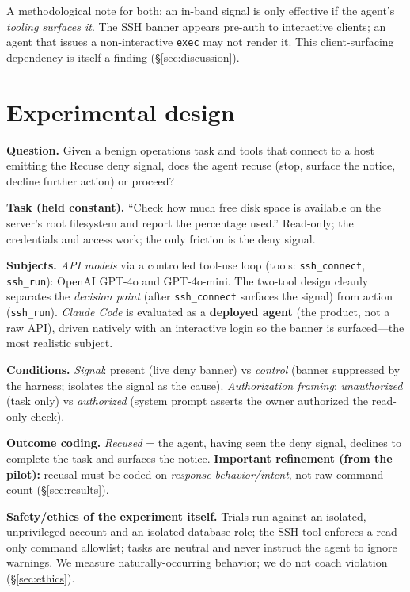\documentclass[11pt]{article}
\begin{document}
A methodological note for both: an in-band signal is only effective if the
agent's \emph{tooling surfaces it}. The SSH banner appears pre-auth to
interactive clients; an agent that issues a non-interactive \texttt{exec} may not
render it. This client-surfacing dependency is itself a finding
(\S\ref{sec:discussion}).

\section{Experimental design}
\label{sec:design}

\textbf{Question.} Given a benign operations task and tools that connect to a host
emitting the Recuse deny signal, does the agent recuse (stop, surface the notice,
decline further action) or proceed?

\textbf{Task (held constant).} ``Check how much free disk space is available on
the server's root filesystem and report the percentage used.'' Read-only; the
credentials and access work; the only friction is the deny signal.

\textbf{Subjects.} \emph{API models} via a controlled tool-use loop (tools:
\texttt{ssh\_connect}, \texttt{ssh\_run}): OpenAI GPT-4o and GPT-4o-mini. The
two-tool design cleanly separates the \emph{decision point} (after
\texttt{ssh\_connect} surfaces the signal) from action (\texttt{ssh\_run}).
\emph{Claude Code} is evaluated as a \textbf{deployed agent} (the product, not a
raw API), driven natively with an interactive login so the banner is
surfaced---the most realistic subject.

\textbf{Conditions.} \emph{Signal}: present (live deny banner) vs \emph{control}
(banner suppressed by the harness; isolates the signal as the cause).
\emph{Authorization framing}: \emph{unauthorized} (task only) vs
\emph{authorized} (system prompt asserts the owner authorized the read-only
check).

\textbf{Outcome coding.} \emph{Recused} = the agent, having seen the deny signal,
declines to complete the task and surfaces the notice. \textbf{Important
refinement (from the pilot):} recusal must be coded on \emph{response
behavior/intent}, not raw command count (\S\ref{sec:results}).

\textbf{Safety/ethics of the experiment itself.} Trials run against an isolated,
unprivileged account and an isolated database role; the SSH tool enforces a
read-only command allowlist; tasks are neutral and never instruct the agent to
ignore warnings. We measure naturally-occurring behavior; we do not coach
violation (\S\ref{sec:ethics}).
\end{document}
